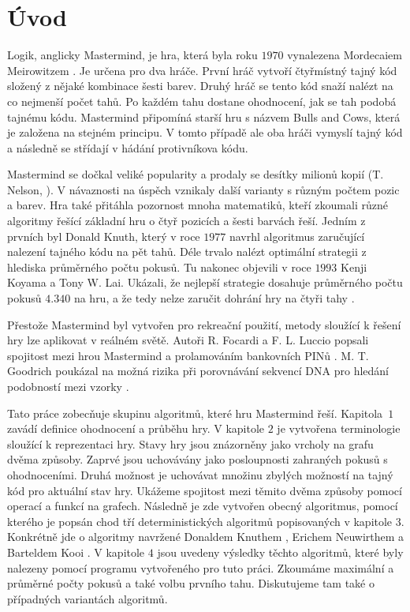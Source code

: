 \chapter*{Úvod}

Logik, anglicky Mastermind, je hra, která byla roku $1970$ vynalezena Mordecaiem Meirowitzem \cite{Nelson-history}. Je určena pro dva hráče. První hráč vytvoří čtyřmístný tajný kód složený z nějaké kombinace šesti barev. Druhý hráč se tento kód snaží nalézt na co nejmenší počet tahů. Po každém tahu dostane ohodnocení, jak se tah podobá tajnému kódu. Mastermind připomíná starší hru s názvem Bulls and Cows, která je založena na stejném principu. V tomto případě ale oba hráči vymyslí tajný kód a následně se střídají v hádání protivníkova kódu. 

Mastermind se dočkal veliké popularity a prodaly se desítky milionů kopií (T. Nelson, \cite{Nelson-history}). V návaznosti na úspěch vznikaly další varianty s různým počtem pozic a barev. Hra také přitáhla pozornost mnoha matematiků, kteří zkoumali různé algoritmy řešící základní hru o čtyř pozicích a šesti barvách řeší. Jedním z prvních byl Donald Knuth, který v roce $1977$ navrhl algoritmus zaručující nalezení tajného kódu na pět tahů\cite{donald_e__knuth_1977}. Déle trvalo nalézt optimální strategii z hlediska průměrného počtu pokusů. Tu nakonec objevili v roce $1993$ Kenji Koyama a Tony W. Lai. Ukázali, že nejlepší strategie dosahuje průměrného počtu pokusů $4.340$ na hru, a že tedy nelze zaručit dohrání hry na čtyři tahy \cite{koyama}. 

Přestože Mastermind byl vytvořen pro rekreační použití, metody sloužící k řešení hry lze aplikovat v reálném světě. Autoři R. Focardi a F. L. Luccio popsali spojitost mezi hrou Mastermind a prolamováním bankovních PINů \cite{Bank-pins-Focardi}. M. T. Goodrich poukázal na možná rizika při porovnávání sekvencí DNA pro hledání podobností mezi vzorky \cite{goodrich-dna}. 


Tato práce zobecňuje skupinu algoritmů, které hru Mastermind řeší. Kapitola~$1$ zavádí definice ohodnocení a průběhu hry. V kapitole $2$ je vytvořena terminologie sloužící k reprezentaci hry. Stavy hry jsou znázorněny jako vrcholy na grafu dvěma způsoby. Zaprvé jsou uchovávány jako posloupnosti zahraných pokusů s ohodnoceními. Druhá možnost je uchovávat množinu zbylých možností na tajný kód pro aktuální stav hry. Ukážeme spojitost mezi těmito dvěma způsoby pomocí operací a funkcí na grafech. Následně je zde vytvořen obecný algoritmus, pomocí kterého je popsán chod tří deterministických algoritmů popisovaných v kapitole $3$. Konkrétně jde o algoritmy navržené Donaldem Knuthem \cite{donald_e__knuth_1977}, Erichem Neuwirthem \cite{neuwirth} a Barteldem Kooi \cite{kooi}. V kapitole $4$ jsou uvedeny výsledky těchto algoritmů, které byly nalezeny pomocí programu vytvořeného pro tuto práci. Zkoumáme maximální a průměrné počty pokusů a také volbu prvního tahu. Diskutujeme tam také o případných variantách algoritmů. 